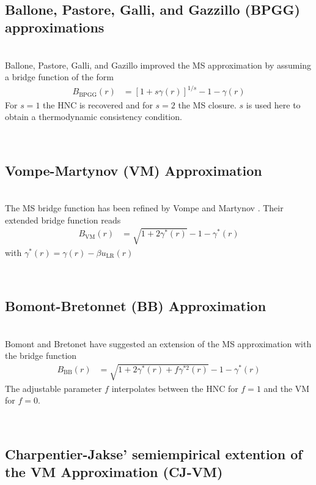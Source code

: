 \vphantom{.}~\\
\subsection{Ballone, Pastore, Galli, and Gazzillo (BPGG) approximations }
~\\

Ballone, Pastore, Galli, and Gazillo  \cite{Ballone1986}
improved the MS approximation by assuming a bridge function of the form
\begin{align}
B_\text{BPGG}(r) &= \left[1+s\gamma(r)\right]^{1/s}-1-\gamma(r)
\end{align}
For $s=1$ the HNC is recovered and for $s=2$ the MS closure. $s$ is used here to
obtain a thermodynamic consistency condition.

\vphantom{.}~\\
\subsection{Vompe-Martynov (VM) Approximation}
~\\

The MS bridge function \cite{Martynov1983} has been refined by Vompe and Martynov \cite{Vompe1994}.
Their extended bridge function reads
\begin{align}
B_\text{VM}(r) &= \sqrt{1+2\gamma^*(r)}-1-\gamma^*(r)
\end{align}
with $\gamma^*(r) = \gamma(r) - \beta u_\text{LR}(r)$

\vphantom{.}~\\
\subsection{Bomont-Bretonnet (BB) Approximation}
~\\

Bomont and Bretonet \cite{Bomont2003,Bomont2004} have suggested an
extension of the MS approximation with the bridge function
\begin{align}
B_\text{BB}(r) &=
\sqrt{1+2\gamma^*(r)+f\gamma^{*2}(r)}-1-\gamma^*(r)
\end{align}
The adjustable parameter $f$ interpolates between the HNC for $f=1$ and the
VM for $f=0$.

\vphantom{.}~\\
\subsection{Charpentier-Jakse' semiempirical extention of the VM Approximation (CJ-VM)}
~\\

